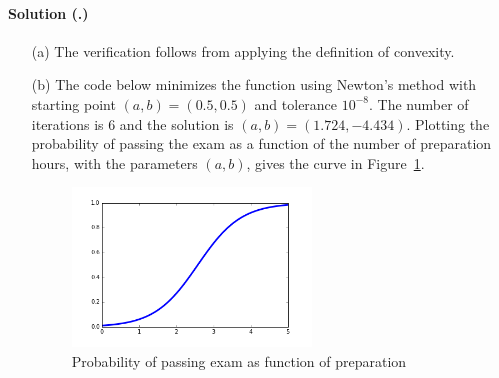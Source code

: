 \documentclass{article}
\newcounter{problemSheetNumber}
\newcounter{problems}
\renewcommand{\solution}[1]{\paragraph{Solution (\theproblemSheetNumber.\theproblems)}\addtocounter{problems}{1}\label{#1}}
\begin{document}
\solution{pr:3} 
\begin{itemize}
 \item[(a)] The verification follows from applying the definition of convexity.
\item[(b)] The code below minimizes the function using Newton's method with starting point $(a,b)=(0.5,0.5)$ and tolerance $10^{-8}$. The number of iterations is 6 and the solution is $(a,b) = (1.724, -4.434)$. Plotting the probability of passing the exam as a function of the number of preparation hours, with the parameters $(a,b)$, gives the curve in Figure~\ref{fig:log}.

\begin{figure}[h!]
 \centering
 \includegraphics[width=0.6\textwidth]{images/logcurve.png}
 \caption{Probability of passing exam as function of preparation}\label{fig:log}
\end{figure}

\end{itemize}
\end{document}
